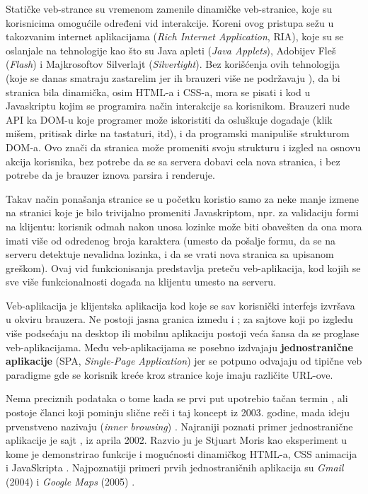 Statičke veb-strance su vremenom zamenile dinamičke veb-stranice, koje su korisnicima omogućile određeni vid interakcije.
Koreni ovog pristupa sežu u takozvanim  internet aplikacijama (\textsl{Rich Internet Application}, RIA), koje su se oslanjale na tehnologije kao što su Java apleti (\textsl{Java Applets}), Adobijev Fleš (\textsl{Flash}) i Majkrosoftov Silverlajt (\textsl{Silverlight}).
Bez korišćenja ovih tehnologija (koje se danas smatraju zastarelim jer ih brauzeri više ne podržavaju \cite{death-of-flash}), da bi stranica bila dinamička, osim HTML-a i CSS-a, mora se pisati i kod u Javaskriptu kojim se programira način interakcije sa korisnikom.
Brauzeri nude API ka DOM-u koje programer može iskoristiti da osluškuje dogadaje (klik mišem, pritisak dirke na tastaturi, itd), i da programski manipuliše strukturom DOM-a.
Ovo znači da stranica može promeniti svoju strukturu i izgled na osnovu akcija korisnika, bez potrebe da se sa servera dobavi cela nova stranica, i bez potrebe da je brauzer iznova parsira i renderuje.

Takav način ponašanja stranice se u početku koristio samo za neke manje izmene na stranici koje je bilo trivijalno promeniti Javaskriptom, npr. za validaciju formi na klijentu: korisnik odmah nakon unosa lozinke može biti obavešten da ona mora imati više od odredenog broja karaktera (umesto da pošalje formu, da se na serveru detektuje nevalidna lozinka, i da se vrati nova stranica sa upisanom greškom).
Ovaj vid funkcionisanja predstavlja preteču veb-aplikacija, kod kojih se sve više funkcionalnosti događa na klijentu umesto na serveru.

Veb-aplikacija je klijentska aplikacija kod koje se sav korisnički interfejs izvršava u okviru brauzera.
Ne postoji jasna granica izmedu  i ; za sajtove koji po izgledu više podsećaju na desktop ili mobilnu aplikaciju postoji veća šansa da se proglase veb-aplikacijama.
Među veb-aplikacijama se posebno izdvajaju \textbf{jednostranične aplikacije} (SPA, \textsl{Single-Page Application}) jer se potpuno odvajaju od tipične veb paradigme gde se korisnik kreće kroz stranice koje imaju različite URL-ove.

Nema preciznih podataka o tome kada se prvi put upotrebio tačan termin , ali postoje članci koji pominju slične reči i taj koncept iz 2003. godine, mada ideju prvenstveno nazivaju  (\textsl{inner browsing}) \cite{mdn:inner-browsing}.
Najraniji poznati primer jednostranične aplikacije je sajt , iz aprila 2002.
Razvio ju je Stjuart  Moris kao eksperiment u kome je demonstrirao funkcije i mogućnosti dinamičkog HTML-a, CSS animacija i JavaSkripta \cite{slashdotslash}.
Najpoznatiji primeri prvih jednostraničnih aplikacija su \textsl{Gmail} (2004) i \textsl{Google Maps} (2005) \cite{aaronsw:ajax-history}.

